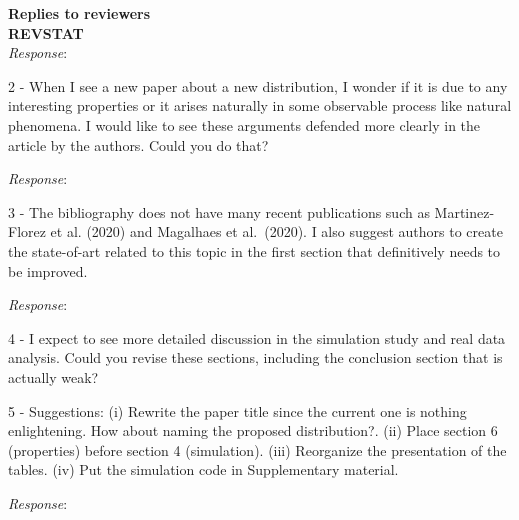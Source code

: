 \documentclass[version=last,12pt,{"maintainersDelight"},letterpaper,]{scrlttr2}
\begin{document}
\begin{letter}{\textbf{Replies to reviewers}\\\textbf{REVSTAT}\\}
\emph{Response}:

2 - When I see a new paper about a new distribution, I wonder if it is
due to any interesting properties or it arises naturally in some
observable process like natural phenomena. I would like to see these
arguments defended more clearly in the article by the authors. Could you
do that?

\emph{Response}:

3 - The bibliography does not have many recent publications such as
Martinez-Florez et al. (2020) and Magalhaes et al.~(2020). I also
suggest authors to create the state-of-art related to this topic in the
first section that definitively needs to be improved.

\emph{Response}:

4 - I expect to see more detailed discussion in the simulation study and
real data analysis. Could you revise these sections, including the
conclusion section that is actually weak?

5 - Suggestions: (i) Rewrite the paper title since the current one is
nothing enlightening. How about naming the proposed distribution?. (ii)
Place section 6 (properties) before section 4 (simulation). (iii)
Reorganize the presentation of the tables. (iv) Put the simulation code
in Supplementary material.

\emph{Response}:


\end{letter}
\end{document}

